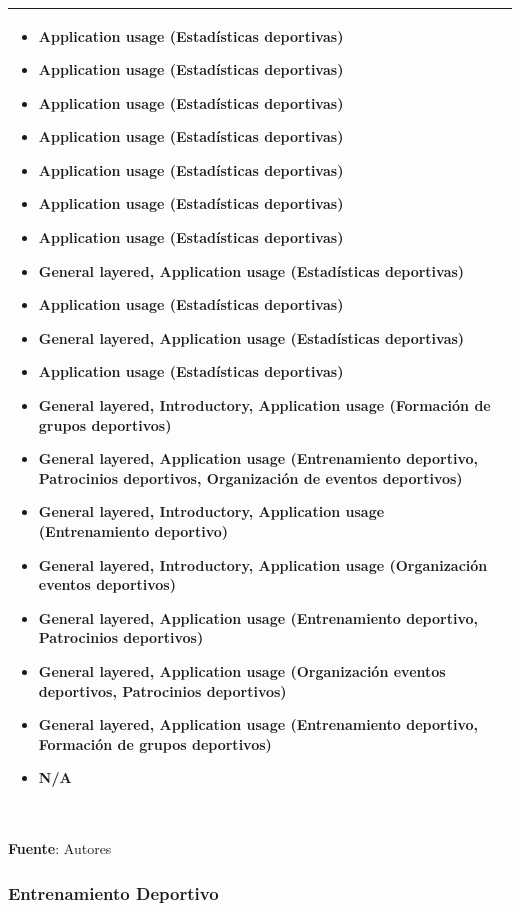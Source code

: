 \begin{table}[!htb]
\begin{center}
{\begin{tabular}{|p{7cm}|p{4cm}|}
\begin{itemize}
				\item Application usage (Estadísticas deportivas)
				\item Application usage (Estadísticas deportivas)
				\item Application usage (Estadísticas deportivas)
				\item Application usage (Estadísticas deportivas)
				\item Application usage (Estadísticas deportivas)
				\item Application usage (Estadísticas deportivas)
				\item Application usage (Estadísticas deportivas)
				\item General layered, Application usage (Estadísticas deportivas) 
				\item Application usage (Estadísticas deportivas) 
				\item General layered, Application usage (Estadísticas deportivas)
				\item Application usage (Estadísticas deportivas)
				\item General layered, Introductory, Application usage (Formación de grupos deportivos)
				\item General layered, Application usage (Entrenamiento deportivo, Patrocinios deportivos, Organización de eventos deportivos)
				\item General layered, Introductory, Application usage (Entrenamiento deportivo)
				\item General layered, Introductory, Application usage (Organización eventos deportivos)
				\item General layered, Application usage (Entrenamiento deportivo, Patrocinios deportivos)
				\item General layered, Application usage (Organización eventos deportivos, Patrocinios deportivos)
				\item General layered, Application usage (Entrenamiento deportivo, Formación de grupos deportivos)
				\item N/A
			\end{itemize} 
			\\
			\hline
		\end{tabular}
		} \\
		\textbf{Fuente}: Autores
	\end{center}
\end{table}

\subsubsection{Entrenamiento Deportivo}

